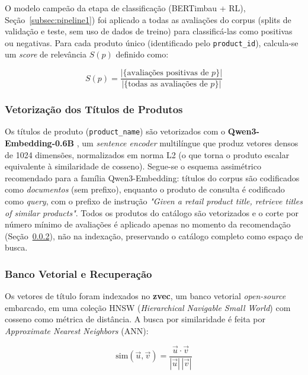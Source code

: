 \documentclass{IEEEtran}
\begin{document}
O modelo campeão da etapa de classificação (BERTimbau + RL),
Seção~\ref{subsec:pipeline1}) foi aplicado a todas as avaliações do corpus (splits
de validação e teste, sem uso de dados de treino) para classificá-las como
positivas ou negativas. Para cada produto único (identificado pelo
\texttt{product\_id}), calcula-se um \textit{score} de relevância $S(p)$ definido
como:

\begin{equation}
  S(p) = \frac{|\{\text{avaliações positivas de } p\}|}{|\{\text{todas as avaliações de } p\}|}
  \label{eq:score}
\end{equation}


\subsubsection{Vetorização dos Títulos de Produtos}
\label{subsubsec:vectorization}

Os títulos de produto (\texttt{product\_name}) são vetorizados com o
\textbf{Qwen3-Embedding-0.6B} \cite{qwen3embedding}, um \textit{sentence encoder} multilíngue que produz vetores densos de 1024 dimensões, normalizados em norma L2 (o que torna o produto escalar equivalente à similaridade de cosseno). Segue-se o esquema assimétrico recomendado para a família Qwen3-Embedding: títulos do corpus são codificados como \textit{documentos} (sem prefixo), enquanto o produto de consulta é codificado como \textit{query}, com o prefixo de instrução \textit{"Given a retail product title, retrieve titles of similar products"}. Todos os produtos do catálogo são
vetorizados e o corte por número mínimo de avaliações é aplicado apenas no momento da recomendação (Seção~\ref{subsubsec:vectordb}), não na indexação, preservando o catálogo completo como espaço de busca.

\subsubsection{Banco Vetorial e Recuperação}
\label{subsubsec:vectordb}

Os vetores de título foram indexados no \textbf{zvec}, um banco vetorial
\textit{open-source} embarcado, em uma coleção HNSW (\textit{Hierarchical Navigable
Small World}) com cosseno como métrica de distância. A busca por similaridade é
feita por \textit{Approximate Nearest Neighbors} (ANN):

\begin{equation}
  \text{sim}(\vec{u}, \vec{v}) = \frac{\vec{u} \cdot \vec{v}}{|\vec{u}|\, |\vec{v}|}
  \label{eq:cosine}
\end{equation}
\end{document}
